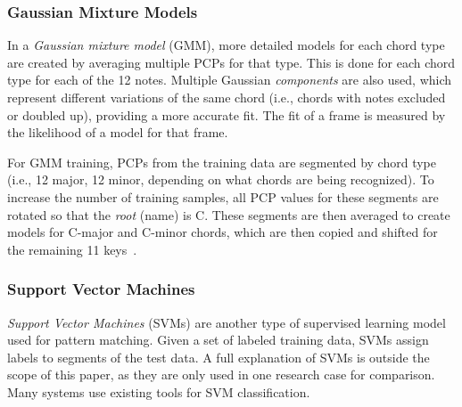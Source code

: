 \documentclass{sig-alternate}
\begin{document}

\subsubsection{Gaussian Mixture Models}

In a \textit{Gaussian mixture model} (GMM), more detailed models for each chord type are created by averaging multiple PCPs for that type. This is done for each chord type for each of the 12 notes. Multiple Gaussian \textit{components} are also used, which represent different variations of the same chord (i.e., chords with notes excluded or doubled up), providing a more accurate fit. The fit of a frame is measured by the likelihood of a model for that frame. 


For GMM training, PCPs from the training data are segmented by chord type (i.e., 12 major, 12 minor, depending on what chords are being recognized). To increase the number of training samples, all PCP values for these segments are rotated so that the \textit{root} (name) is C. These segments are then averaged to create models for C-major and C-minor chords, which are then copied and shifted for the remaining 11 keys~\cite{McVicar:2014}.



\subsubsection{Support Vector Machines}

\textit{Support Vector Machines} (SVMs) are another type of supervised learning model used for pattern matching. Given a set of labeled training data, SVMs assign labels to segments of the test data. A full explanation of SVMs is outside the scope of this paper, as they are only used in one research case for comparison. Many systems use existing tools for SVM classification.
\end{document}
